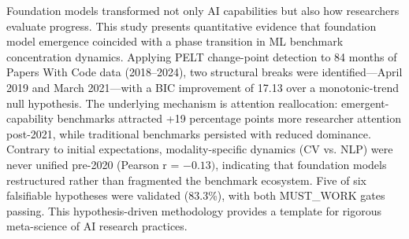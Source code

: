 
Foundation models transformed not only AI capabilities but also how researchers evaluate progress. This study presents quantitative evidence that foundation model emergence coincided with a phase transition in ML benchmark concentration dynamics. Applying PELT change-point detection to 84 months of Papers With Code data (2018--2024), two structural breaks were identified---April 2019 and March 2021---with a BIC improvement of 17.13 over a monotonic-trend null hypothesis. The underlying mechanism is attention reallocation: emergent-capability benchmarks attracted +19 percentage points more researcher attention post-2021, while traditional benchmarks persisted with reduced dominance. Contrary to initial expectations, modality-specific dynamics (CV vs. NLP) were never unified pre-2020 (Pearson r = $-0.13)$, indicating that foundation models restructured rather than fragmented the benchmark ecosystem. Five of six falsifiable hypotheses were validated (83.3\%), with both MUST\_WORK gates passing. This hypothesis-driven methodology provides a template for rigorous meta-science of AI research practices.
